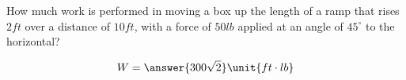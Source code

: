 \documentclass{ximera}
\author{Gregory Hartman \and Matthew Carr}
\begin{document}
\begin{exercise}




How much work is performed in moving a box up the length of a ramp that rises $2\unit{ft}$ over a distance of $10\unit{ft}$, with a force of $50\unit{lb}$ applied at an angle of $45^{\circ}$ to the horizontal?

\begin{prompt}
\[
W=\answer{300\sqrt{2}}\unit{ft\cdot lb}
\]
\end{prompt}

\end{exercise}
\end{document}
